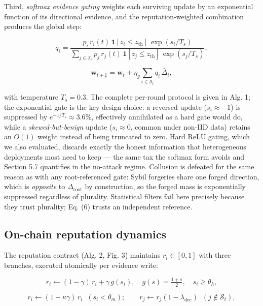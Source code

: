 \documentclass[cmc,article,submit,moreauthors,pdftex]{Definitions/tsp}
\begin{document}
Third, \emph{softmax evidence gating} weights each surviving update by an exponential function of its directional evidence, and the reputation-weighted combination produces the global step:

\begin{equation}
q_i = \frac{p_i \, r_i(t)\,\mathbf{1}[z_i \le z_{\mathrm{th}}]\,\exp(s_i/T_s)}{\sum_{j \in \mathcal{S}_t} p_j \, r_j(t)\,\mathbf{1}[z_j \le z_{\mathrm{th}}]\,\exp(s_j/T_s)},
\tag{6}
\end{equation}

\begin{equation}
\mathbf{w}_{t+1} = \mathbf{w}_t + \eta_g \sum_{i \in \mathcal{S}_t} q_i \, \bar{\Delta}_i,
\tag{7}
\end{equation}

with temperature $T_s = 0.3$. The complete per-round protocol is given in Alg. 1; the exponential gate is the key design choice: a reversed update ($s_i \approx -1$) is suppressed by $e^{-1/T_s} \approx 3.6\%$, effectively annihilated as a hard gate would do, while a \emph{skewed-but-benign} update ($s_i \approx 0$, common under non-IID data) retains an $O(1)$ weight instead of being truncated to zero. Hard ReLU gating, which we also evaluated, discards exactly the honest information that heterogeneous deployments most need to keep --- the same tax the softmax form avoids and Section 5.7 quantifies in the no-attack regime. Collusion is defeated for the same reason as with any root-referenced gate: Sybil forgeries share one forged direction, which is \emph{opposite} to $\Delta_{\mathrm{root}}$ by construction, so the forged mass is exponentially suppressed regardless of plurality. Statistical filters fail here precisely because they trust plurality; Eq. (6) trusts an independent reference.

\subsection{On-chain reputation dynamics}\label{sec:on-chain-reputation-dynamics}

The reputation contract (Alg. 2, Fig. 3) maintains $r_i \in [0,1]$ with three branches, executed atomically per evidence write:

\begin{equation}
r_i \leftarrow (1-\gamma)\, r_i + \gamma\, g(s_i), \quad g(s) = \tfrac{1+s}{2}, \quad s_i \geq \theta_h,
\tag{8}
\end{equation}

\begin{equation}
r_i \leftarrow (1-\kappa\gamma)\, r_i \;\; (s_i < \theta_m); \qquad r_j \leftarrow r_j (1-\lambda_{\mathrm{dec}}) \;\; (j \notin \mathcal{S}_t),
\tag{9}
\end{equation}
\end{document}
